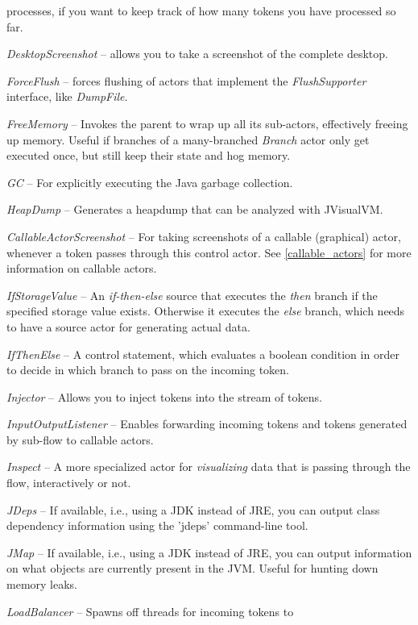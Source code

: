 \begin{tight_itemize}
	processes, if you want to keep track of how many tokens you have processed so
	far.
	\item \textit{DesktopScreenshot} -- allows you to take a screenshot
	of the complete desktop.
	\item \textit{ForceFlush} -- forces flushing of actors that implement
	the \textit{FlushSupporter} interface, like \textit{DumpFile}.
	\item \textit{FreeMemory} -- Invokes the parent to wrap up all its
	sub-actors, effectively freeing up memory. Useful if branches of a
	many-branched \textit{Branch} actor only get executed once, but still keep
	their state and hog memory.
	\item \textit{GC} -- For explicitly executing the Java garbage collection.
	\item \textit{HeapDump} -- Generates a heapdump that can be analyzed with JVisualVM.
	\item \textit{CallableActorScreenshot} -- For taking screenshots of a callable
	(graphical) actor, whenever a token passes through this control actor.
	See \ref{callable_actors} for more information on callable actors.
	\item \textit{IfStorageValue} -- An \textit{if-then-else} source that executes
	the \textit{then} branch if the specified storage value exists. Otherwise it
	executes the \textit{else} branch, which needs to have a source actor for
	generating actual data.
	\item \textit{IfThenElse} -- A control statement, which evaluates a boolean
	condition in order to decide in which branch to pass on the incoming token.
	\item \textit{Injector} -- Allows you to inject tokens into the stream of
	tokens.
	\item \textit{InputOutputListener} -- Enables forwarding incoming tokens
	and tokens generated by sub-flow to callable actors.
	\item \textit{Inspect} -- A more specialized actor for \textit{visualizing} data
	that is passing through the flow, interactively or not.
	\item \textit{JDeps} -- If available, i.e., using a JDK instead of JRE, you can
	output class dependency information using the 'jdeps' command-line tool.
	\item \textit{JMap} -- If available, i.e., using a JDK instead of JRE, you can
	output information on what objects are currently present in the JVM. Useful for
	hunting down memory leaks.
	\item \textit{LoadBalancer} -- Spawns off threads for incoming tokens to

\end{tight_itemize}
